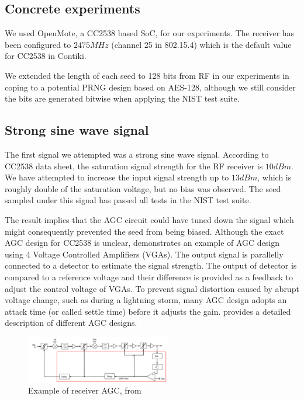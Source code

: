 \subsection{Concrete experiments}
We used OpenMote\cite{OpenMote}, a CC2538 based SoC, for our experiments. The receiver has been configured to $2475MHz$ (channel 25 in 802.15.4) which is the default value for CC2538 in Contiki. 

We extended the length of each seed to 128 bits from RF in our experiments in coping to a potential PRNG design based on AES-128, although we still consider the bits are generated bitwise when applying the NIST test suite.

\subsection{Strong sine wave signal} \label{StrongSine}
The first signal we attempted was a strong sine wave signal. According to CC2538 data sheet\cite{CC2538Datasheet}, the saturation signal strength for the RF receiver is $10 dBm$. We have attempted to increase the input signal strength up to $13dBm$, which is roughly double of the saturation voltage, but no bias was observed. The seed sampled under this signal has passed all tests in the NIST test suite.

The result implies that the AGC circuit could have tuned down the signal which might consequently prevented the seed from being biased. Although the exact AGC design for CC2538 is unclear,  demonstrates an example of AGC design using 4 Voltage Controlled Amplifiers (VGAs). The output signal is parallelly connected to a detector to estimate the signal strength. The output of detector is compared to a reference voltage and their difference is provided as a feedback to adjust the control voltage of VGAs. To prevent signal distortion caused by abrupt voltage change, such as during a lightning storm, many AGC design adopts an attack time (or called settle time) before it adjusts the gain. \cite{AGC} provides a detailed description of different AGC designs. 

\begin{figure}[!t]
\centering
\includegraphics[width=2.5in]{fig/AGC.png}
\caption{Example of receiver AGC, from \cite{AGC_QSL}}
\label{AGC_QSL}
\end{figure}



